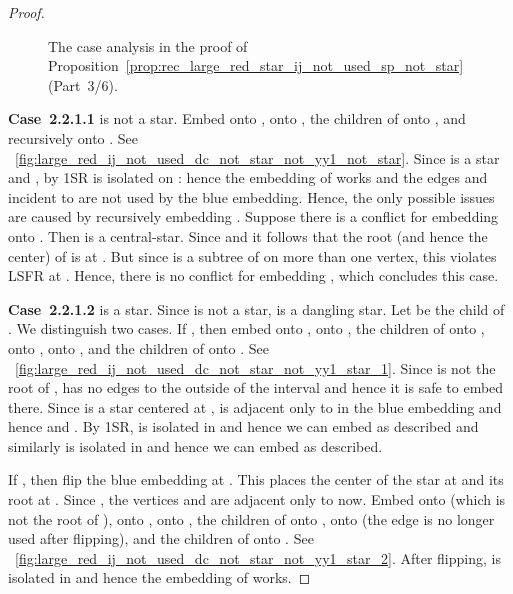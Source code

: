 \documentclass[11pt,a4paper,colorlinks=true,urlcolor=blue,citecolor=red]{article}
\theoremstyle{plain}
\newcommand{\case}[1]{\par\vspace{.5\baselineskip}\noindent\textbf{\sffamily Case~#1}}
\begin{document}
\begin{proof}
  \begin{figure}[b]
    \centering\hfil {}\hfil {}\hfil {}\hfil {}\hfil \caption{The case analysis in the proof of
      Proposition~\ref{prop:rec_large_red_star_ij_not_used_sp_not_star}~(Part~3/6).}
  \end{figure}

  \case{2.2.1.1}  is not a star. Embed  onto ,  onto ,
  the children of  onto , and  recursively onto
  . See
  \figurename~\ref{fig:large_red_ij_not_used_dc_not_star_not_yy1_not_star}.
  Since  is a star and , by 1SR  is isolated on
  : hence the embedding of  works and the edges  and
   incident to  are not used by the blue embedding. Hence,
  the only possible issues are caused by recursively embedding .
  Suppose there is a conflict for embedding  onto .
  Then  is a central-star. Since
   and  it follows that the root (and hence the
  center) of  is at . But since  is a
  subtree of  on more than one vertex, this violates LSFR at .
  Hence, there is no conflict for embedding , which concludes
  this case.

  \case{2.2.1.2}  is a star. Since  is not a star,  is a
  dangling star. Let  be the child of . We distinguish two cases.
  If , then embed  onto ,  onto , the children of
   onto ,  onto ,  onto , and the children
  of  onto . See
  \figurename~\ref{fig:large_red_ij_not_used_dc_not_star_not_yy1_star_1}.
  Since  is not the root of ,  has no edges to the outside
  of the interval and hence it is safe to embed  there. Since
   is a star centered at ,  is adjacent only to  in
  the blue embedding and hence  and
  . By 1SR,  is isolated in  and
  hence we can embed  as described and similarly  is isolated in
   and hence we can embed  as described.

  If , then flip the blue embedding at . This
  places the center of the star  at  and its root at .
  Since , the vertices  and  are adjacent only to
   now. Embed  onto  (which is not the root of ), 
  onto ,  onto , the children of  onto , 
  onto  (the edge  is no longer used after flipping),
  and the children of  onto . See
  \figurename~\ref{fig:large_red_ij_not_used_dc_not_star_not_yy1_star_2}.
  After flipping,  is isolated in  and hence the
  embedding of  works.


\end{proof}
\end{document}
